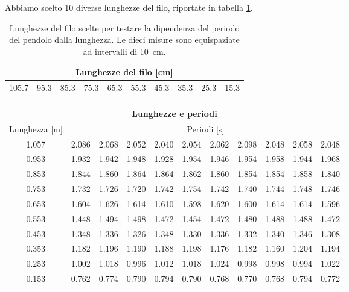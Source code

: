 Abbiamo scelto 10 diverse lunghezze del filo, riportate in tabella \ref{tab:lunghezze_filo}.

\begin{table}
    \centering
    \begin{tabular}{c c c c c c c c c c}
        \multicolumn{10}{c}{\textbf{Lunghezze del filo [cm]}} \\
        \toprule
        105.7 & 95.3 & 85.3 & 75.3 & 65.3 & 55.3 & 45.3 & 35.3 & 25.3 & 15.3 \\
        \bottomrule
    \end{tabular}
    \caption{Lunghezze del filo scelte per testare la dipendenza del periodo
        del pendolo dalla lunghezza. Le dieci misure sono equispaziate ad intervalli di \SI{10}{\centi\metre}.}
    \label{tab:lunghezze_filo}
\end{table}

\begin{table}
    \centering
    \begin{tabular}{c c c c c c c c c c c}
        \multicolumn{11}{c}{\textbf{Lunghezze e periodi}} \\
        \toprule
        Lunghezza [m] & \multicolumn{10}{c}{Periodi [s]} \\
        \midrule
        1.057 & 2.086 & 2.068 & 2.052 & 2.040 & 2.054 & 2.062 & 2.098 & 2.048 & 2.058 & 2.048 \\
        0.953 & 1.932 & 1.942 & 1.948 & 1.928 & 1.954 & 1.946 & 1.954 & 1.958 & 1.944 & 1.968 \\
        0.853 & 1.844 & 1.860 & 1.864 & 1.864 & 1.862 & 1.860 & 1.854 & 1.854 & 1.858 & 1.840 \\
        0.753 & 1.732 & 1.726 & 1.720 & 1.742 & 1.754 & 1.742 & 1.740 & 1.744 & 1.748 & 1.746 \\
        0.653 & 1.604 & 1.626 & 1.614 & 1.610 & 1.598 & 1.620 & 1.600 & 1.614 & 1.614 & 1.596 \\
        0.553 & 1.448 & 1.494 & 1.498 & 1.472 & 1.454 & 1.472 & 1.480 & 1.488 & 1.488 & 1.472 \\
        0.453 & 1.348 & 1.336 & 1.326 & 1.348 & 1.330 & 1.336 & 1.332 & 1.340 & 1.346 & 1.308 \\
        0.353 & 1.182 & 1.196 & 1.190 & 1.188 & 1.198 & 1.176 & 1.182 & 1.160 & 1.204 & 1.194 \\
        0.253 & 1.002 & 1.018 & 0.996 & 1.012 & 1.018 & 1.024 & 0.998 & 0.998 & 0.994 & 1.022 \\
        0.153 & 0.762 & 0.774 & 0.790 & 0.794 & 0.790 & 0.768 & 0.770 & 0.768 & 0.794 & 0.772 \\
        \bottomrule
    \end{tabular}
\end{table}
